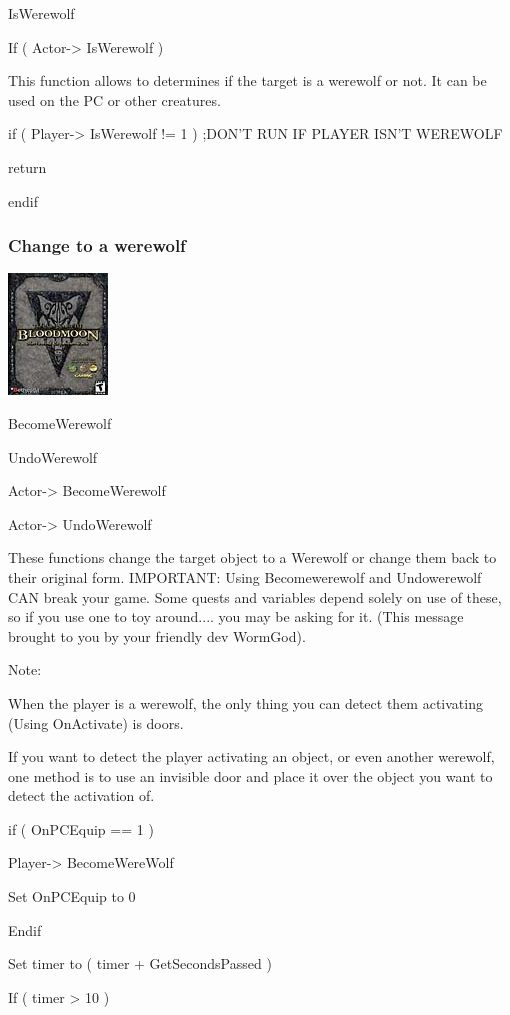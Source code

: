 IsWerewolf

If ( Actor-> IsWerewolf )

This function allows to determines if the target is a werewolf or not.
It can be used on the PC or other creatures.

if ( Player-> IsWerewolf != 1 ) ;DON'T RUN IF PLAYER ISN'T
WEREWOLF

return

endif

\hypertarget{change-to-a-werewolf}{%
\subsubsection{Change to a werewolf}\label{change-to-a-werewolf}}

\includegraphics{media/image7.png}

BecomeWerewolf

UndoWerewolf

Actor-> BecomeWerewolf

Actor-> UndoWerewolf

These functions change the target object to a Werewolf or change them
back to their original form. IMPORTANT: Using Becomewerewolf and
Undowerewolf CAN break your game. Some quests and variables depend
solely on use of these, so if you use one to toy around.... you may be
asking for it. (This message brought to you by your friendly dev
WormGod).

Note:

When the player is a werewolf, the only thing you can detect them
activating (Using OnActivate) is doors.

If you want to detect the player activating an object, or even another
werewolf, one method is to use an invisible door and place it over the
object you want to detect the activation of.

if ( OnPCEquip == 1 )

Player-> BecomeWereWolf

Set OnPCEquip to 0

Endif

Set timer to ( timer + GetSecondsPassed )

If ( timer > 10 )


